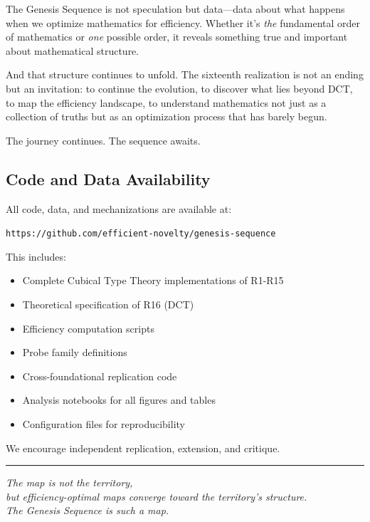 \documentclass[11pt]{article}
\theoremstyle{definition}
\begin{document}
The Genesis Sequence is not speculation but data—data about what happens when we optimize mathematics for efficiency. Whether it's \emph{the} fundamental order of mathematics or \emph{one} possible order, it reveals something true and important about mathematical structure.

And that structure continues to unfold. The sixteenth realization is not an ending but an invitation: to continue the evolution, to discover what lies beyond DCT, to map the efficiency landscape, to understand mathematics not just as a collection of truths but as an optimization process that has barely begun.

The journey continues. The sequence awaits.

\subsection{Code and Data Availability}

All code, data, and mechanizations are available at:
\begin{center}
\texttt{https://github.com/efficient-novelty/genesis-sequence}
\end{center}

This includes:
\begin{itemize}
\item Complete Cubical Type Theory implementations of R1-R15
\item Theoretical specification of R16 (DCT)
\item Efficiency computation scripts
\item Probe family definitions
\item Cross-foundational replication code
\item Analysis notebooks for all figures and tables
\item Configuration files for reproducibility
\end{itemize}

We encourage independent replication, extension, and critique.

\vspace{2em}

\begin{center}
\rule{0.3\textwidth}{0.4pt}
\end{center}

\vspace{1em}

\begin{center}
\emph{The map is not the territory,}\\
\emph{but efficiency-optimal maps converge toward the territory's structure.}\\
\emph{The Genesis Sequence is such a map.}
\end{center}
\end{document}
